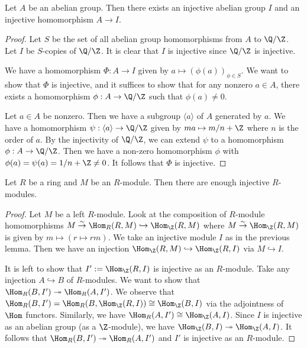 \begin{lemma}
    Let $A$ be an abelian group.
    Then there exists an injective abelian group $I$
    and an injective homomorphism $A \to I$.
\end{lemma}
\begin{proof}
    Let $S$ be the set of all abelian group homomorphisms
    from $A$ to $\Q/\Z$.
    Let $I$ be $S$-copies of $\Q/\Z$.
    It is clear that $I$ is injective since $\Q/\Z$ is injective.

    We have a homomorphism $\Phi: A \to I$ given by $a \mapsto (\phi(a))_{\phi \in S}$.
    We want to show that $\Phi$ is injective,
    and it suffices to show that for any nonzero $a \in A$,
    there exists a homomorphism $\phi: A \to \Q/\Z$ such that $\phi(a) \neq 0$.

    Let $a \in A$ be nonzero. Then we have a subgroup $\langle a \rangle$ of $A$
    generated by $a$. We have a homomorphism $\psi: \langle a \rangle \to \Q/\Z$ given by $ma \mapsto m/n +\Z$ where $n$ is the order of $a$.
    By the injectivity of $\Q/\Z$, we can extend $\psi$ to a homomorphism $\phi: A \to \Q/\Z$.
    Then we have a non-zero homomorphism $\phi$ with $\phi(a) = \psi(a) = 1/n + \Z \neq 0$.
    It follows that $\Phi$ is injective.
\end{proof}

\begin{proposition}
    Let $R$ be a ring and $M$ be an $R$-module.
    Then there are enough injective $R$-modules.
\end{proposition}
\begin{proof}
    Let $M$ be a left $R$-module.
    Look at the composition of $R$-module homomorphisms $M \overset{\sim}{\to} \Hom_{R}(R, M) \hookrightarrow \Hom_{\Z}(R, M)$
    where $M \overset{\sim}{\to} \Hom_{\Z}(R, M)$ is given by $m \mapsto (r \mapsto rm)$.
    We take an injective module $I$ as in the previous lemma.
    Then we have an injection $\Hom_{\Z}(R, M) \hookrightarrow \Hom_{\Z}(R, I)$
    via $M \hookrightarrow I$.
    
    It is left to show that $I':=\Hom_{\Z}(R, I)$ is injective as an $R$-module.
    Take any injection $A \hookrightarrow B$ of $R$-modules.
    We want to show that $\Hom_{R}(B, I') \twoheadrightarrow \Hom_{R}(A, I')$.
    We observe that $\Hom_{R}(B, I') = \Hom_{R}(B, \Hom_{\Z}(R, I)) \cong \Hom_{\Z}(B, I)$
    via the adjointness of $\Hom$ functors.
    Similarly, we have $\Hom_{R}(A, I') \cong \Hom_{\Z}(A, I)$.
    Since $I$ is injective as an abelian group (as a $\Z$-module), we have $\Hom_{\Z}(B, I) \twoheadrightarrow \Hom_{\Z}(A, I)$.
    It follows that $\Hom_{R}(B, I') \twoheadrightarrow \Hom_{R}(A, I')$ and $I'$ is injective as an $R$-module.
\end{proof}

